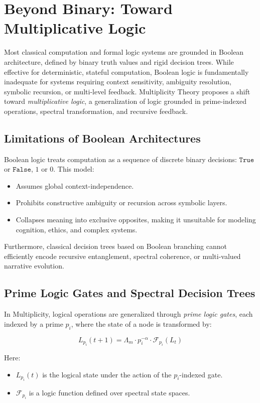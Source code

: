 \documentclass{article}
\theoremstyle{plain}
\begin{document}
\section{Beyond Binary: Toward Multiplicative Logic}

Most classical computation and formal logic systems are grounded in Boolean architecture, defined by binary truth values and rigid decision trees. While effective for deterministic, stateful computation, Boolean logic is fundamentally inadequate for systems requiring context sensitivity, ambiguity resolution, symbolic recursion, or multi-level feedback. Multiplicity Theory proposes a shift toward \textit{multiplicative logic}, a generalization of logic grounded in prime-indexed operations, spectral transformation, and recursive feedback.

\subsection{Limitations of Boolean Architectures}

Boolean logic treats computation as a sequence of discrete binary decisions: \( \texttt{True} \) or \( \texttt{False} \), \( 1 \) or \( 0 \). This model:
\begin{itemize}
    \item Assumes global context-independence.
    \item Prohibits constructive ambiguity or recursion across symbolic layers.
    \item Collapses meaning into exclusive opposites, making it unsuitable for modeling cognition, ethics, and complex systems.
\end{itemize}

Furthermore, classical decision trees based on Boolean branching cannot efficiently encode recursive entanglement, spectral coherence, or multi-valued narrative evolution.

\subsection{Prime Logic Gates and Spectral Decision Trees}

In Multiplicity, logical operations are generalized through \textit{prime logic gates}, each indexed by a prime \( p_i \), where the state of a node is transformed by:

\[
L_{p_i}(t+1) = \Lambda_m \cdot p_i^{-\alpha} \cdot \mathcal{F}_{p_i}(L_t)
\]

Here:
\begin{itemize}
    \item \( L_{p_i}(t) \) is the logical state under the action of the \( p_i \)-indexed gate.
    \item \( \mathcal{F}_{p_i} \) is a logic function defined over spectral state spaces.
\end{itemize}
\end{document}
